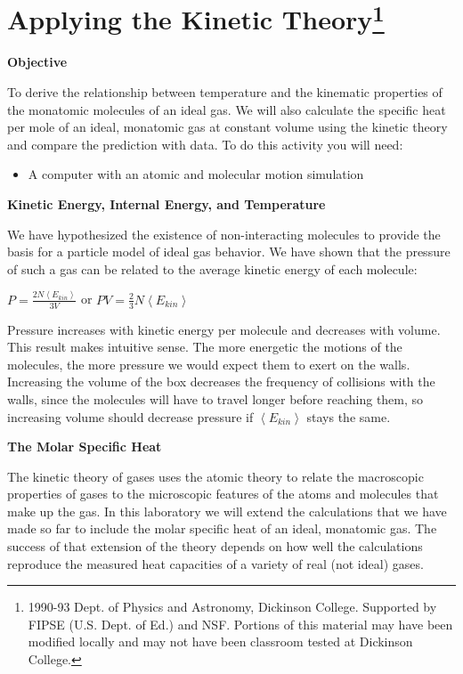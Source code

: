 
\section{Applying the Kinetic Theory\footnote{%
1990-93 Dept. of Physics and Astronomy, Dickinson College. Supported
by FIPSE (U.S. Dept. of Ed.) and NSF. Portions of this material may
have been modified locally and may not have been classroom tested
at Dickinson College.
}}

\makelabheader %

\textbf{Objective}

To derive the relationship between temperature and the kinematic properties
of the monatomic molecules of an ideal gas. We will also calculate
the specific heat per mole of an ideal, monatomic gas at constant
volume using the kinetic theory and compare the prediction with data.
To do this activity you will need:

\begin{itemize}
\item A computer with an atomic and molecular motion simulation
\end{itemize}

\textbf{Kinetic Energy, Internal Energy, and Temperature}

We have hypothesized the existence of non-interacting molecules to
provide the basis for a particle model of ideal gas behavior. We have
shown that the pressure of such a gas can be related to the average
kinetic energy of each molecule:

{\centering \( P=\frac{2N\left\langle E_{kin}\right\rangle }{3V} \)
or \( PV=\frac{2}{3}N\left\langle E_{kin}\right\rangle  \)\par}

Pressure increases with kinetic energy per molecule and decreases
with volume. This result makes intuitive sense. The more energetic
the motions of the molecules, the more pressure we would expect them
to exert on the walls. Increasing the volume of the box decreases
the frequency of collisions with the walls, since the molecules will
have to travel longer before reaching them, so increasing volume should
decrease pressure if \( \left\langle E_{kin}\right\rangle  \) stays
the same.

\textbf{The Molar Specific Heat}

The kinetic theory of gases uses the atomic theory to relate the macroscopic
properties of gases to the microscopic features of the atoms and molecules
that make up the gas. In this laboratory we will extend the calculations
that we have made so far to include the molar specific heat of an
ideal, monatomic gas. The success of that extension of the theory
depends on how well the calculations reproduce the measured heat capacities
of a variety of real (not ideal) gases.

